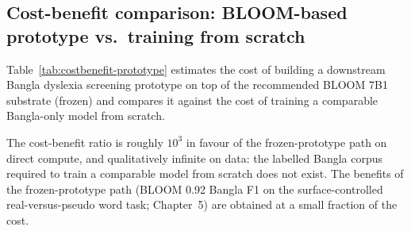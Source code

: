 \subsection*{Cost-benefit comparison: BLOOM-based prototype vs.\ training from scratch}

Table~\ref{tab:costbenefit-prototype} estimates the cost of building a downstream Bangla dyslexia screening prototype on top of the recommended BLOOM 7B1 substrate (frozen) and compares it against the cost of training a comparable Bangla-only model from scratch.

\begin{table}[H]
\centering
\caption{Cost-benefit comparison: BLOOM-based frozen prototype vs.\ training a comparable Bangla-only model from scratch. All numbers are order-of-magnitude estimates intended for project-planning use.}
\label{tab:costbenefit-prototype}
\small
{}
\end{table}

The cost-benefit ratio is roughly $10^{3}$ in favour of the frozen-prototype path on direct compute, and qualitatively infinite on data: the labelled Bangla corpus required to train a comparable model from scratch does not exist. The benefits of the frozen-prototype path (BLOOM 0.92 Bangla F1 on the surface-controlled real-versus-pseudo word task; Chapter~5) are obtained at a small fraction of the cost.

